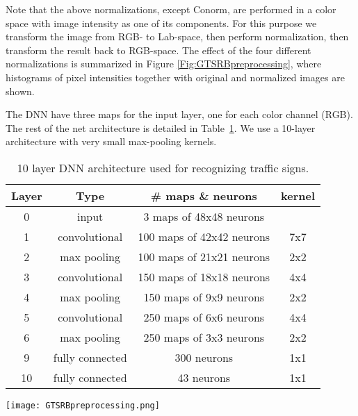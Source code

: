 \documentclass[a4paper]{article}
\begin{document}
Note that the above normalizations, except Conorm, are performed in a color space with image intensity as one of its components. For this purpose we transform the image from RGB- to Lab-space, then perform normalization, then transform the result back to RGB-space. The effect of the four different normalizations is summarized in Figure \ref{Fig:GTSRBpreprocessing}, where histograms of pixel intensities together with original and normalized images are shown.

The DNN have three maps for the input layer, one for each color channel (RGB). The rest of the net architecture is detailed in Table~\ref{tab:netGTSRB}. We use a 10-layer architecture with very small max-pooling kernels.

\begin{table}[h!]
\caption{10 layer DNN architecture used for recognizing traffic signs.} 
\small
\begin{center}
\begin{tabular}{c|c|c|c}
Layer		&	Type			&	\# maps \& neurons			&	kernel	\\
\hline
0		&	input			&	3 maps of 48x48 neurons		&			\\
1		&	convolutional	&	100 maps of 42x42 neurons		&	7x7		\\
2		&	max pooling	&	100 maps of 21x21 neurons		&	2x2		\\
3		&	convolutional	&	150 maps of 18x18 neurons		&	4x4		\\
4		&	max pooling	&	150 maps of 9x9 neurons		&	2x2		\\
5		&	convolutional	&	250 maps of 6x6 neurons		&	4x4		\\
6		&	max pooling	&	250 maps of 3x3 neurons		&	2x2		\\
9		&	fully connected	&	300 neurons				&	1x1		\\
10		&	fully connected	&	43 neurons				&	1x1		\\
\end{tabular}
\label{tab:netGTSRB}
\end{center}
\end{table}

\begin{figure*}[ht!]
\hfill
\begin{center}
\texttt{[image: GTSRBpreprocessing.png]}
\end{center}
\caption{Preprocessing.}
\label{Fig:GTSRBpreprocessing}
\end{figure*}


\newpage
\end{document}
